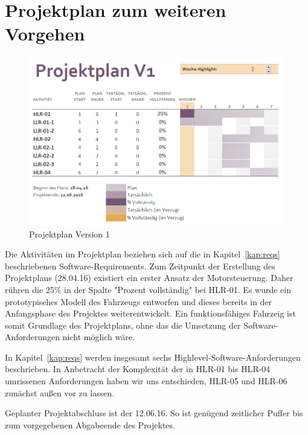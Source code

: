 \documentclass[a4paper,12pt]{article}                                         %
\numberwithin{table}{section}                               %
\numberwithin{figure}{section}                              %
\renewcommand{\thetable}{\arabic{section}.\arabic{table}}   %
\renewcommand{\thefigure}{\arabic{section}.\arabic{figure}} %
\begin{document}
	\newpage
	\section{Projektplan zum weiteren Vorgehen}
	
		\begin{figure}[h]
			\begin{center}
				\includegraphics[scale=0.8]{../Bilder/PlanV1.png}
			\end{center}
			\caption{Projektplan Version 1}
		\end{figure}
		
	Die Aktivitäten im Projektplan beziehen sich auf die in Kapitel~\ref{kap:reqs} beschriebenen Software-Requirements. Zum Zeitpunkt der Erstellung des Projektplans (28.04.16) existiert ein erster Ansatz der Motorsteuerung. Daher rühren die 25\% in der Spalte "Prozent vollständig" bei HLR-01. Es wurde ein prototypisches Modell des Fahrzeugs entworfen und dieses bereits in der Anfangsphase des Projektes weiterentwickelt. Ein funktionsfähiges Fahrzeig ist somit Grundlage des Projektplans, ohne das die Umsetzung der Software-Anforderungen nicht möglich wäre. 
	
	\bigskip
	In Kapitel~\ref{kap:reqs} werden insgesamt sechs Highlevel-Software-Anforderungen beschrieben. In Anbetracht der Komplexität der in HLR-01 bis HLR-04 umrissenen Anforderungen haben wir uns entschieden, HLR-05 und HLR-06 zunächst außen vor zu lassen. 
	
	\bigskip
	Geplanter Projektabschluss ist der 12.06.16. So ist genügend zeitlicher Puffer bis zum vorgegebenen Abgabeende des Projektes.
		
	\renewcommand{\thetable}{\Alph{section}.\arabic{table}}              %
	\renewcommand{\thefigure}{\Alph{section}.\arabic{figure}}            %
	\renewcommand{\thelstlisting}{\Alph{section}.\arabic{lstlisting}}    %
	
	\begin{appendix}
	\end{appendix}
	
	
	
	
\end{document}
